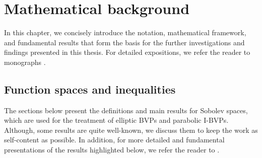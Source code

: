 \chapter{Mathematical background}
\label{chapter:mathematical-background}

In this chapter, we concisely introduce the notation, mathematical framework, and 
fundamental results that form the basis for the further investigations and 
findings presented in this thesis. For detailed expositions, we refer the reader
to monographs \cite{NeittaanmakiRepin2004,RepinDeGruyter2008,Malietall2014}.

\section{Function spaces and inequalities}
\label{sec:function-space-inequalities}

The sections below present the definitions and main results for Sobolev spaces, 
which are used for the treatment of elliptic BVPs and parabolic I-BVPs. Although, 
some results are quite well-known, we discuss them to keep the work as self-content
as possible. In addition, for more detailed 
and fundamental presentations of the results highlighted below, we refer the reader 
to \cite{Evans2010, Zeidler1990A, Zeidler1990B, Wloka1987}.



